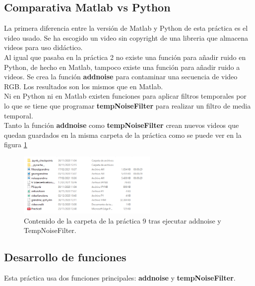 \documentclass[a4paper,12pt]{report}
\begin{document}
\subsection{Comparativa Matlab vs Python}

La primera diferencia entre la versión de Matlab y Python de esta práctica es el video usado. Se ha escogido un video sin copyright de una libreria que almacena videos para uso didáctico.\\

Al igual que pasaba en la práctica 2 no existe una función para añadir ruido en Python, de hecho en Matlab, tampoco existe una función para añadir ruido a videos. Se crea la función \textbf{addnoise} para contaminar una secuencia de video RGB. Los resultados son los mismos que en Matlab.\\

Ni en Python ni en Matlab existen funciones para aplicar filtros temporales por lo que se tiene que programar \textbf{tempNoiseFilter} para realizar un filtro de media temporal.\\ 

Tanto la función \textbf{addnoise} como \textbf{tempNoiseFilter} crean nuevos videos que quedan guardados en la misma carpeta de la práctica como se puede ver en la figura \ref{carpetaP9}

\begin{figure}[h]
\centering
\includegraphics[width=0.6\textwidth]{imagenes/carpetaP9}
\caption{Contenido de la carpeta de la práctica 9 tras ejecutar addnoise y TempNoiseFilter.}
\label{carpetaP9} 
\end{figure}

\subsection{Desarrollo de funciones}

Esta práctica usa dos funciones principales: \textbf{addnoise} y \textbf{tempNoiseFilter}.\\
\end{document}
